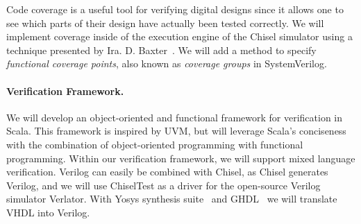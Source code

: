 \documentclass[fleqn,12pt]{article}
\begin{document}
Code coverage is a useful tool for verifying digital designs
since it allows one to see which parts of their design have actually been tested correctly. 
We will implement coverage inside of the execution engine of the Chisel simulator using a technique
presented by Ira. D. Baxter~\cite{branch-cov-made-easy:2002}.
We will add a method to specify \textit{functional coverage points}, also known as
\textit{coverage groups} in SystemVerilog.



%


\paragraph{Verification Framework.}

We will develop an object-oriented and functional framework for verification in Scala.
This framework is inspired by UVM, but will leverage Scala's conciseness with the
combination of object-oriented programming with functional programming.
%
Within our verification framework, we will support mixed language verification.
Verilog can easily be combined with Chisel, as Chisel generates Verilog, and
we will use ChiselTest as a driver for the open-source Verilog simulator Verlator.
With Yosys synthesis suite~\cite{Yosys} and GHDL~\cite{ghdl}
we will translate VHDL into Verilog.
\end{document}
